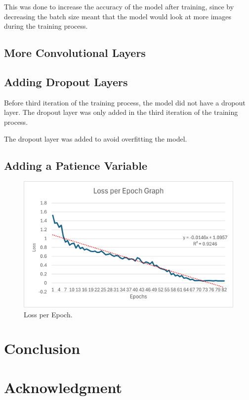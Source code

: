 \documentclass[conference]{IEEEtran}
\begin{document}
This was done to increase the accuracy of the model after training, since by decreasing the batch size meant that the model would look at more images during the training process.

\subsection{More Convolutional Layers}

\subsection{Adding Dropout Layers}

Before third iteration of the training process, the model did not have a dropout layer. The dropout layer was only added in the third iteration of the training process.

The dropout layer was added to avoid overfitting the model.

\subsection{Adding a Patience Variable}

\begin{figure}[h]
    \centering
    \includegraphics[width=\linewidth]{Loss_per_Epoch_Graph.png}
    \caption{Loss per Epoch.}
    \label{fig 3}
\end{figure}

\section{Conclusion}

\section*{Acknowledgment}
\end{document}
